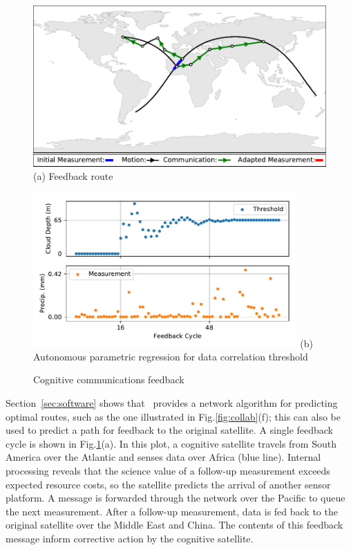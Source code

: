 \documentclass[conference]{IEEEtran}
\newcommand{\project}{{\sc{Collaborate}}~}
\begin{document}
\begin{figure}[b!]
  \begin{minipage}[b]{\linewidth}
    \begin{center}
      \includegraphics[width=\textwidth]{images/loop.pdf}
      {\footnotesize(a) Feedback route}
    \end{center}
  \end{minipage}
  \begin{minipage}[b]{\linewidth}
    \begin{center}
      \includegraphics[width=0.9\textwidth]{images/regression.pdf}
      {\footnotesize(b) Autonomous parametric regression for data correlation
        threshold}
    \end{center}
  \end{minipage}
  \caption{Cognitive communications feedback}
  \label{fig:feedback}
\end{figure}

Section~\ref{sec:software} shows that \project provides a network algorithm for predicting optimal routes, such as the one illustrated in Fig.\ref{fig:collab}(f); this can also be used to predict a path for feedback to the original satellite.  A single feedback cycle is shown in Fig.\ref{fig:feedback}(a).  In this plot, a cognitive satellite travels from South America over the Atlantic and senses data over Africa (blue line).  Internal processing reveals that the science value of a follow-up measurement exceeds expected resource costs, so the satellite predicts the arrival of another sensor platform.  A message is forwarded through the network over the Pacific to queue the next measurement.  After a follow-up measurement, data is fed back to the original satellite over the Middle East and China.  The contents of this feedback message inform corrective action by the cognitive satellite.
\end{document}
